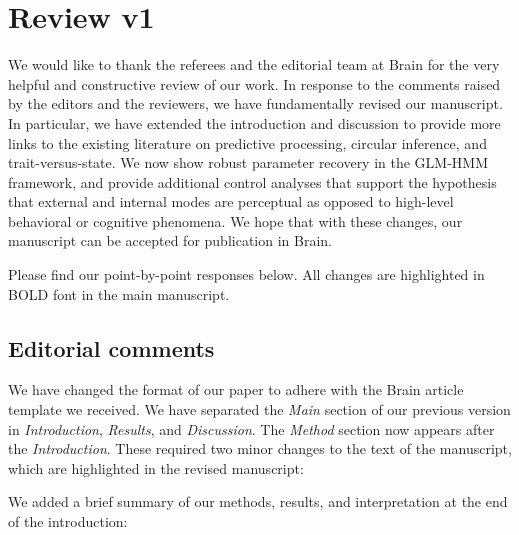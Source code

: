 \documentclass[
]{article}
\begin{document}
\newpage

\section{Review v1}\label{review-v1}

We would like to thank the referees and the editorial team at Brain for
the very helpful and constructive review of our work. In response to the
comments raised by the editors and the reviewers, we have fundamentally
revised our manuscript. In particular, we have extended the introduction
and discussion to provide more links to the existing literature on
predictive processing, circular inference, and trait-versus-state. We
now show robust parameter recovery in the GLM-HMM framework, and provide
additional control analyses that support the hypothesis that external
and internal modes are perceptual as opposed to high-level behavioral or
cognitive phenomena. We hope that with these changes, our manuscript can
be accepted for publication in Brain.

Please find our point-by-point responses below. All changes are
highlighted in BOLD font in the main manuscript.

\subsection{Editorial comments}\label{editorial-comments}

We have changed the format of our paper to adhere with the Brain article
template we received. We have separated the \emph{Main} section of our
previous version in \emph{Introduction}, \emph{Results}, and
\emph{Discussion}. The \emph{Method} section now appears after the
\emph{Introduction}. These required two minor changes to the text of the
manuscript, which are highlighted in the revised manuscript:

We added a brief summary of our methods, results, and interpretation at
the end of the introduction:
\end{document}
